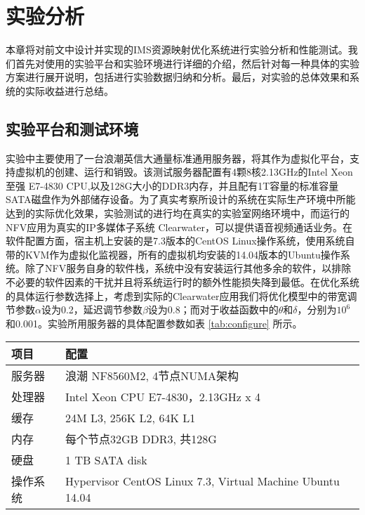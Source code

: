 \chapter{实验分析}
\label{chapter:evaluation}
本章将对前文中设计并实现的IMS资源映射优化系统进行实验分析和性能测试。我们首先对使用的实验平台和实验环境进行详细的介绍，然后针对每一种具体的实验方案进行展开说明，包括进行实验数据归纳和分析。最后，对实验的总体效果和系统的实际收益进行总结。

\section{实验平台和测试环境}
实验中主要使用了一台浪潮英信大通量标准通用服务器，将其作为虚拟化平台，支持虚拟机的创建、运行和销毁。该测试服务器配置有4颗8核2.13GHz的Intel Xeon至强 E7-4830 CPU,以及128G大小的DDR3内存，并且配有1T容量的标准容量SATA磁盘作为外部储存设备。为了真实考察所设计的系统在实际生产环境中所能达到的实际优化效果，实验测试的进行均在真实的实验室网络环境中，而运行的NFV应用为真实的IP多媒体子系统 Clearwater，可以提供语音视频通话业务。在软件配置方面，宿主机上安装的是7.3版本的CentOS Linux操作系统，使用系统自带的KVM作为虚拟化监视器，所有的虚拟机均安装的14.04版本的Ubuntu操作系统。除了NFV服务自身的软件栈，系统中没有安装运行其他多余的软件，以排除不必要的软件因素的干扰并且将系统运行时的额外性能损失降到最低。在优化系统的具体运行参数选择上，考虑到实际的Clearwater应用我们将优化模型中的带宽调节参数$\alpha$设为0.2，延迟调节参数$\beta$设为0.8；而对于收益函数中的$\theta$和$\delta$，分别为$10^{6}$和0.001。实验所用服务器的具体配置参数如表 \ref{tab:configure} 所示。

\begin{table}[htb]
	\centering
	\begin{tabular}{ | l | p{9cm} |}\hline
		\textbf{项目} &							 \textbf{配置}  				\\ 	\hline
		服务器        &					 浪潮 NF8560M2, 4节点NUMA架构\\ \hline
		处理器 	   &  Intel Xeon CPU E7-4830，2.13GHz x 4  \\ \hline
		缓存    & 24M L3, 256K L2,  64K L1 \\ \hline
		内存 			&  每个节点32GB DDR3,  共128G   \\   \hline
		硬盘     & 				1 TB SATA disk \\ \hline
		操作系统    & Hypervisor CentOS Linux 7.3, Virtual Machine Ubuntu 14.04 \\ \hline
	\end{tabular}
\end{table}
\newpage


